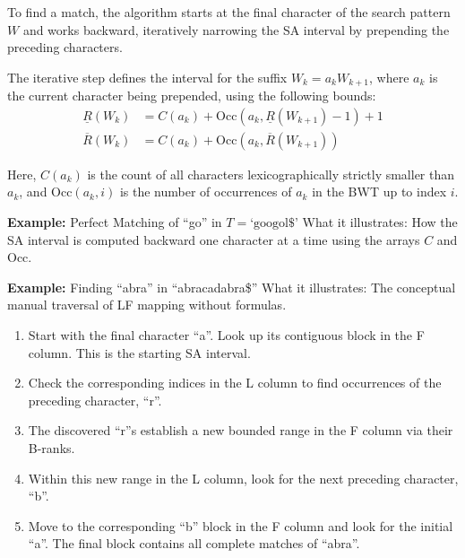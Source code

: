\documentclass{article}
\begin{document}
To find a match, the algorithm starts at the final character of the search pattern $W$ and works backward, iteratively narrowing the SA interval by prepending the preceding characters. 

The iterative step defines the interval for the suffix $W_k = a_k W_{k+1}$, where $a_k$ is the current character being prepended, using the following bounds:
\begin{align}
    \underline{R}(W_k) &= C(a_k) + \text{Occ}(a_k, \underline{R}(W_{k+1}) - 1) + 1 \label{eq:lower_bound} \\
    \overline{R}(W_k) &= C(a_k) + \text{Occ}(a_k, \overline{R}(W_{k+1})) \label{eq:upper_bound}
\end{align}

Here, $C(a_k)$ is the count of all characters lexicographically strictly smaller than $a_k$, and $\text{Occ}(a_k, i)$ is the number of occurrences of $a_k$ in the BWT up to index $i$.

\textbf{Example:} Perfect Matching of ``go'' in $T = \text{`googol\$'}$
What it illustrates: How the SA interval is computed backward one character at a time using the arrays $C$ and $\text{Occ}$.

\textbf{Example:} Finding ``abra'' in ``abracadabra\$''
What it illustrates: The conceptual manual traversal of LF mapping without formulas.
\begin{enumerate}
    \item Start with the final character ``a''. Look up its contiguous block in the F column. This is the starting SA interval.
    \item Check the corresponding indices in the L column to find occurrences of the preceding character, ``r''.
    \item The discovered ``r''s establish a new bounded range in the F column via their B-ranks.
    \item Within this new range in the L column, look for the next preceding character, ``b''.
    \item Move to the corresponding ``b'' block in the F column and look for the initial ``a''. The final block contains all complete matches of ``abra''.
\end{enumerate}
\end{document}
